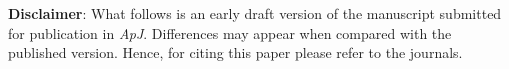 \documentclass[../../main/thesis_msc.tex]{subfiles}
\begin{document}
		\vspace{15cm}
		\textbf{Disclaimer}: What follows is an early draft version of the manuscript submitted for publication in \textit{ApJ}. Differences may appear when compared with the published version. Hence, for citing this paper please refer to the journals.

\newpage

     
     
	

	
\end{document}
